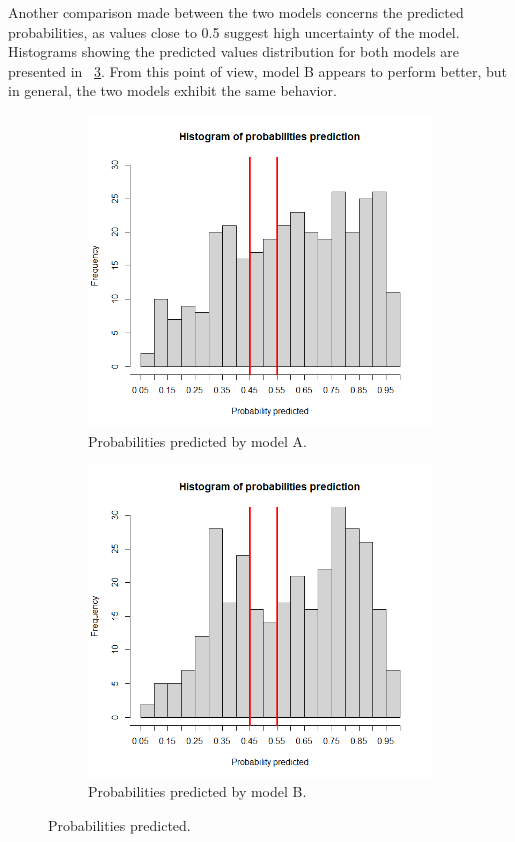 Another comparison made between the two models concerns the predicted probabilities, as values close to 0.5 suggest high uncertainty of the model. Histograms showing the predicted values distribution for both models are presented in \Fig~\ref{fig:ProbPred}. From this point of view, model B appears to perform better, but in general, the two models exhibit the same behavior.

\begin{figure}[H]
	\begin{subfigure}{.6\textwidth}
		\centering
		\includegraphics[width=0.7\linewidth]{ImageFiles/Classification/LogReg/probability_pred_all}
		\caption{Probabilities predicted by model A.}
		\label{fig:ProbPredA}
	\end{subfigure}
	\begin{subfigure}{.6\textwidth}
		\centering
		\includegraphics[width=0.7\linewidth]{ImageFiles/Classification/LogReg/probability_pred_imp}
		\caption{Probabilities predicted by model B.}
		\label{fig:ProbPredB}
	\end{subfigure}
	\caption{Probabilities predicted.}
	\label{fig:ProbPred}
\end{figure}


